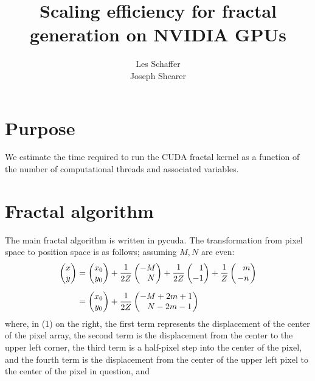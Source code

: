 \documentclass[10pt]{article} %
\title{Scaling efficiency for fractal generation on NVIDIA GPUs}
\author{Les Schaffer\\Joseph Shearer}
\date{} %
\begin{document}
\maketitle

\section{Purpose}
We estimate the time required to run the CUDA fractal kernel as a function of the number of computational threads and associated variables.

\section{Fractal algorithm}
The main fractal algorithm is written in pycuda. The transformation from pixel space to position space is as follows; assuming $M,N$ are even:
\begin{align}
\begin{pmatrix}x\\y\end{pmatrix} &= \begin{pmatrix}x_0\\y_0\end{pmatrix}
+\frac{1}{2Z}\begin{pmatrix}-M\\\phantom{-}N\end{pmatrix}
+\frac{1}{2Z}\begin{pmatrix}\phantom{-}1\\-1\end{pmatrix}
+\frac{1}{Z}\begin{pmatrix}\phantom{-}m\\-n\end{pmatrix}\\
\noalign{\vbox{}}
 &= \begin{pmatrix}x_0\\y_0\end{pmatrix}
 +\frac{1}{2Z}\begin{pmatrix}-M+2m+1\\\phantom{-}N-2m-1\end{pmatrix}
\end{align}
where, in (1) on the right,  the first term represents the displacement of the center of the pixel array, the second term is the displacement from the center to the upper left corner, the third term is a half-pixel step into the center of the pixel, and the fourth term is the displacement from the center of the upper left pixel to the center of the pixel in question, and 
\end{document}
